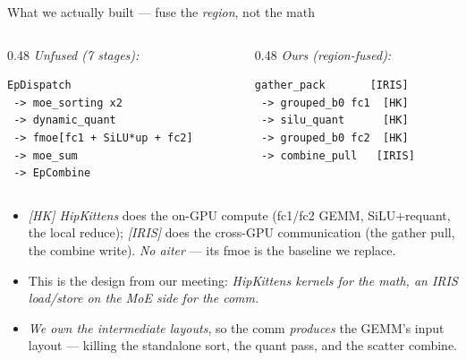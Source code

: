 \documentclass[pdf,aspectratio=169]{beamer}
\newcommand{\empy}[1]{{\color{darkorange}\emph{#1}}}
\newcommand{\empr}[1]{{\color{cardinalred}\emph{#1}}}
\newcommand{\mc}[1]{{\ttfamily\small #1}}
\begin{document}
\begin{frame}[fragile]{What we actually built --- fuse the \emph{region}, not the math}
\footnotesize
\vspace{0.5ex}
\begin{columns}
\begin{column}{0.48\textwidth}
\empr{Unfused (7 stages):}
\begin{lstlisting}
EpDispatch
 -> moe_sorting x2
 -> dynamic_quant
 -> fmoe[fc1 + SiLU*up + fc2]
 -> moe_sum
 -> EpCombine
\end{lstlisting}
\end{column}
\begin{column}{0.48\textwidth}
\empy{Ours (region-fused):}
\begin{lstlisting}
gather_pack       [IRIS]
 -> grouped_b0 fc1  [HK]
 -> silu_quant      [HK]
 -> grouped_b0 fc2  [HK]
 -> combine_pull   [IRIS]
\end{lstlisting}
\end{column}
\end{columns}
\vspace{1ex}
\begin{itemize}\footnotesize
  \item \empy{[HK] HipKittens} does the on-GPU compute (fc1/fc2 GEMM, SiLU$+$requant, the local reduce); \empy{[IRIS]} does the cross-GPU communication (the gather pull, the combine write). \empr{No aiter} --- its \mc{fmoe} is the baseline we replace.
  \item This is the design from our meeting: \emph{HipKittens kernels for the math, an IRIS load/store on the MoE side for the comm.}
  \item \empr{We own the intermediate layouts}, so the comm \emph{produces} the GEMM's input layout --- killing the standalone sort, the quant pass, and the scatter combine.
\end{itemize}
\end{frame}
\end{document}
